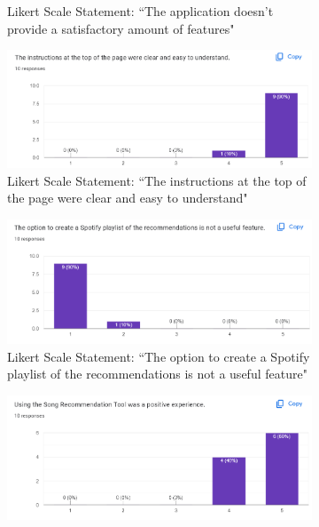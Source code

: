 \documentclass{l4proj}
\begin{document}
\begin{figure}
\begin{subfigure} [b] {0.49\textwidth}
        \caption{Likert Scale Statement: ``The application doesn't provide a satisfactory amount of features"}
        \label{fig:Q6}
    \end{subfigure}
    \hfill
    \begin{subfigure} [b] {0.49\textwidth}
        \centering
        \includegraphics[width=1\textwidth]{images/Q7.png}
        \caption{Likert Scale Statement: ``The instructions at the top of the page were clear and easy to understand"}
        \label{fig:Q7}
    \end{subfigure}
    \hfill
    \begin{subfigure} [b] {0.49\textwidth}
        \centering
        \includegraphics[width=1\textwidth]{images/Q8.png}
        \caption{Likert Scale Statement: ``The option to create a Spotify playlist of the recommendations is not a useful feature"}
        \label{fig:Q8}
    \end{subfigure}
    \hfill
    \begin{subfigure} [b] {0.49\textwidth}
        \centering
        \includegraphics[width=1\textwidth]{images/Q9.png}

\end{subfigure}
\end{figure}
\end{document}
